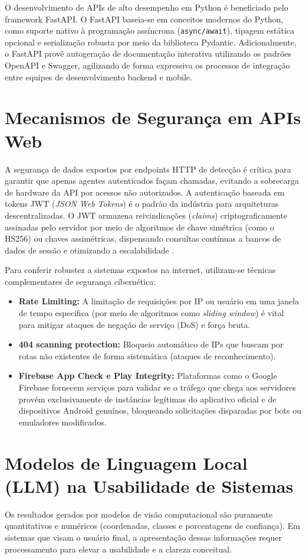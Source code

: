 O desenvolvimento de APIs de alto desempenho em Python é beneficiado pelo framework FastAPI. O FastAPI baseia-se em conceitos modernos do Python, como suporte nativo à programação assíncrona (\texttt{async/await}), tipagem estática opcional e serialização robusta por meio da biblioteca Pydantic. Adicionalmente, o FastAPI provê autogeração de documentação interativa utilizando os padrões OpenAPI e Swagger, agilizando de forma expressiva os processos de integração entre equipes de desenvolvimento backend e mobile.

\section{Mecanismos de Segurança em APIs Web}
A segurança de dados expostos por endpoints HTTP de detecção é crítica para garantir que apenas agentes autenticados façam chamadas, evitando a sobrecarga de hardware da API por acessos não autorizados. A autenticação baseada em tokens JWT (\textit{JSON Web Tokens}) é o padrão da indústria para arquiteturas descentralizadas. O JWT armazena reivindicações (\textit{claims}) criptograficamente assinadas pelo servidor por meio de algoritmos de chave simétrica (como o HS256) ou chaves assimétricas, dispensando consultas contínuas a bancos de dados de sessão e otimizando a escalabilidade \cite{rfc7519}.

Para conferir robustez a sistemas expostos na internet, utilizam-se técnicas complementares de segurança cibernética:
\begin{itemize}
    \item \textbf{Rate Limiting:} A limitação de requisições por IP ou usuário em uma janela de tempo específica (por meio de algoritmos como \textit{sliding window}) é vital para mitigar ataques de negação de serviço (DoS) e força bruta.
    \item \textbf{404 scanning protection:} Bloqueio automático de IPs que buscam por rotas não existentes de forma sistemática (ataques de reconhecimento).
    \item \textbf{Firebase App Check e Play Integrity:} Plataformas como o Google Firebase fornecem serviços para validar se o tráfego que chega aos servidores provém exclusivamente de instâncias legítimas do aplicativo oficial e de dispositivos Android genuínos, bloqueando solicitações disparadas por bots ou emuladores modificados.
\end{itemize}

\section{Modelos de Linguagem Local (LLM) na Usabilidade de Sistemas}
Os resultados gerados por modelos de visão computacional são puramente quantitativos e numéricos (coordenadas, classes e porcentagens de confiança). Em sistemas que visam o usuário final, a apresentação dessas informações requer processamento para elevar a usabilidade e a clareza conceitual. 

